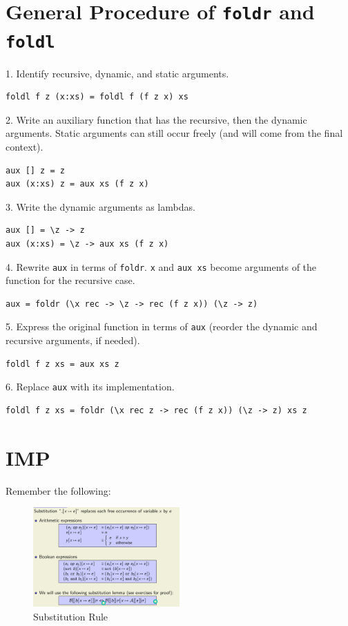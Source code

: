 \documentclass{article}
\begin{document}
\section*{General Procedure of \texttt{foldr} and \texttt{foldl}}

1. Identify recursive, dynamic, and static arguments.

\begin{lstlisting}[style=haskellstyle, caption=Haskell Code, label=code:haskell]
foldl f z (x:xs) = foldl f (f z x) xs
\end{lstlisting}
2. Write an auxiliary function that has the recursive, then the dynamic arguments. Static arguments can still occur freely (and will come from the final context).
\begin{lstlisting}[style=haskellstyle, caption=Haskell Code, label=code:haskell]
aux [] z = z
aux (x:xs) z = aux xs (f z x)
\end{lstlisting}
3. Write the dynamic arguments as lambdas.
\begin{lstlisting}[style=haskellstyle, caption=Haskell Code, label=code:haskell]
aux [] = \z -> z
aux (x:xs) = \z -> aux xs (f z x)
\end{lstlisting}
4. Rewrite \texttt{aux} in terms of \texttt{foldr}. \texttt{x} and \texttt{aux xs} become arguments of the function for the recursive case.
\begin{lstlisting}[style=haskellstyle, caption=Haskell Code, label=code:haskell]
aux = foldr (\x rec -> \z -> rec (f z x)) (\z -> z)
\end{lstlisting}
5. Express the original function in terms of \texttt{aux} (reorder the dynamic and recursive arguments, if needed).
\begin{lstlisting}[style=haskellstyle, caption=Haskell Code, label=code:haskell]
foldl f z xs = aux xs z
\end{lstlisting}
6. Replace \texttt{aux} with its implementation.
\begin{lstlisting}[style=haskellstyle, caption=Haskell Code, label=code:haskell]
foldl f z xs = foldr (\x rec z -> rec (f z x)) (\z -> z) xs z
\end{lstlisting}
\section{IMP}

Remember the following:
\begin{figure}[ht]
    \centering
    \includegraphics[width=0.5\textwidth]{assets/substitution-rule.png}
    \caption{Substitution Rule}
\end{figure}
\end{document}
